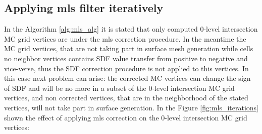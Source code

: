 \subsection{Applying mls filter iteratively}
In the Algorithm \ref{alg:mls_alg} it is stated that only computed 0-level intersection MC grid vertices are under the mls correction procedure. In the meantime the MC grid vertices, that are not taking part in surface mesh generation while cells no neighbor vertices contains SDF value transfer from positive to negative and vice-verse, thus the SDF correction procedure is not applied to this vertices. In this case next problem can arise: the corrected MC vertices can change the sign of SDF and will be no more in a subset of the 0-level intersection MC grid vertices, and non corrected vertices, that are in the neighborhood of the stated vertices, will not take part in surface generation. In the Figure \ref{fig:mls_iterations} shown the effect of applying mls correction on the 0-level intersection MC grid vertices:
